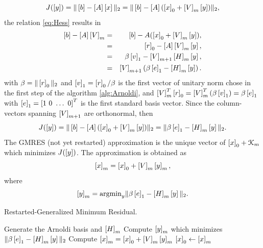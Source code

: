 $$J(\left[{{y}}\right]) = \Vert \left[{{b}}\right] - \left[A\right] \left[{{x}}\right] \Vert_2 = \Vert \left[{{b}}\right] - \left[A\right] (\left[{{x}}\right]_0 + \left[V\right]_m \left[{{y}}\right])\Vert_2,$$
\noindent the relation \eqref{eq:Hess} results in
\begin{eqnarray*}
\left[{{b}}\right] - \left[A\right] \left[V\right]_m &= &\left[{{b}}\right] - {A}(\left[{{x}}\right]_0 + \left[V\right]_m \left[{{y}}\right]),\\
&= & \left[{{r}}\right]_0 - \left[A\right] \left[V\right]_m \left[{{y}}\right],\\
&= & \beta\left[{{v}}\right]_1 - \left[V\right]_{m+1} \left[H\right]_m \left[{{y}}\right],\\
&= & \left[V\right]_{m+1} \left( \beta\left[{{e}}\right]_1 - \left[H\right]_m \left[{{y}}\right]\right).
\end{eqnarray*}
\noindent with $\beta = \Vert \left[{{r}}\right]_0 \Vert_2$ and $\left[{{v}}\right]_1 = \left[{{r}}\right]_0/\beta$ is the first vector of unitary norm chose in the first step of the algorithm \ref{alg:Arnoldi}, and $\left[V\right]_m^T\left[{{r}}\right]_0 = \left[V\right]_m^T(\beta\left[{{v}}\right]_1) = \beta\left[{{e}}\right]_1$ with $\left[{{e}}\right]_1 = \left[{{1 \ 0 \ \ldots \ 0}}\right]^T$ is the first standard basis vector. Since the column-vectors spanning $\left[V\right]_{m+1}$ are orthonormal, then
$$J(\left[{{y}}\right]) = \Vert \left[{{b}}\right] - \left[A\right] (\left[{{x}}\right]_0 + \left[V\right]_m \left[{{y}}\right])\Vert_2 = \Vert \beta\left[{{e}}\right]_1 - \left[H\right]_m \left[{{y}}\right] \Vert_2.$$
\noindent The GMRES \cite{saad1986gmres} (not yet restarted) approximation is the unique vector of $\left[{{x}}\right]_0 + \mathcal{K}_m$  which minimizes $J(\left[{{y}}\right])$. The approximation is obtained as $$\left[{{x}}\right]_m = \left[{{x}}\right]_0 + \left[V\right]_m \left[{{y}}\right]_m,$$ where $$\left[{{y}}\right]_m = \mathrm{argmin}_y \Vert \beta\left[{{e}}\right]_1 - \left[H\right]_m \left[{{y}}\right] \Vert_2.$$
%
\begin{algorithm}[ht!]
\begin{algorithmic}
\caption{Restarted-Generalized Minimum Residual.}
\label{alg:rGMRES}
	\State Generate the Arnoldi basis and $\left[H\right]_m$
	\State Compute $\left[{{y}}\right]_m$ which minimizes $\Vert \beta\left[{{e}}\right]_1 - \left[H\right]_m \left[{{y}}\right] \Vert_2$ 
	\State Compute $\left[{{x}}\right]_m = \left[{{x}}\right]_0 + \left[V\right]_m \left[{{y}}\right]_m$
	\EndFor
	\State $\left[{{x}}\right]_0 \gets \left[{{x}}\right]_m$ 
\EndWhile
\end{algorithmic}
\end{algorithm}
%


